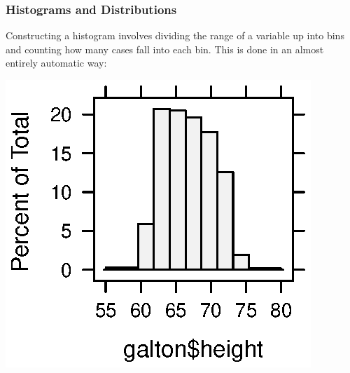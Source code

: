 \subsubsection{Histograms and Distributions}


Constructing a histogram involves dividing the range of a variable up
into bins and counting how many cases fall into each bin.  This is
done in an almost entirely automatic way:
\begin{Schunk}
\end{Schunk}
\includegraphics{Figures/variation-var1-hist}

